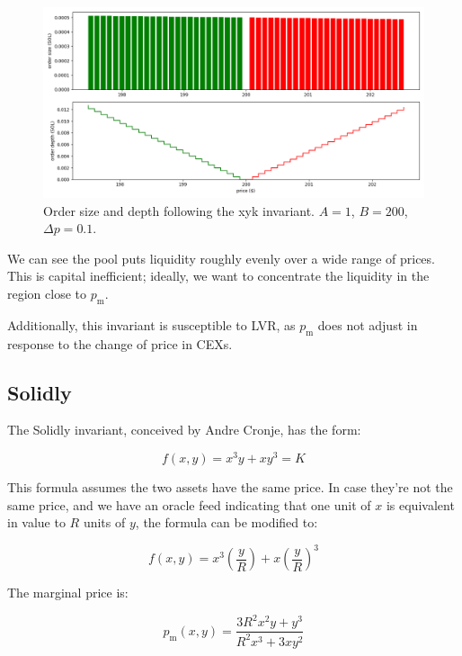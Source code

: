 \documentclass{article}
\begin{document}
\begin{figure}
  \includegraphics[width=\textwidth]{1-xyk.png}
  \caption{Order size and depth following the xyk invariant. $A = 1$, $B = 200$, $\Delta p = 0.1$.}
  \label{fig:1}
\end{figure}

We can see the pool puts liquidity roughly evenly over a wide range of prices. This is capital inefficient; ideally, we want to concentrate the liquidity in the region close to $p_{\mathrm{m}}$.

Additionally, this invariant is susceptible to LVR, as $p_{\mathrm{m}}$ does not adjust in response to the change of price in CEXs.

\subsection{Solidly}

The Solidly invariant, conceived by Andre Cronje,\supercite{andrecronjetwitter} has the form:

\begin{equation}
  f(x, y) = x^3 y + x y^3 = K
\end{equation}

This formula assumes the two assets have the same price. In case they're not the same price, and we have an oracle feed indicating that one unit of $x$ is equivalent in value to $R$ units of $y$, the formula can be modified to:

\begin{equation}
  f(x, y) = x^3 \left( \frac{y}{R} \right) + x \left( \frac{y}{R} \right)^3
\end{equation}

The marginal price is:

\begin{equation}
  p_{\mathrm{m}} (x, y) = \frac{3 R^2 x^2 y + y^3}{R^2 x^3 + 3 x y^2}
\end{equation}
\end{document}
